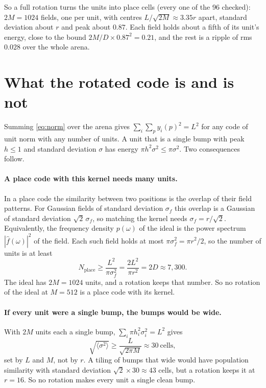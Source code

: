 \documentclass[11pt]{article}
\begin{document}
So a full rotation turns the units into place cells (every one of the 96 checked): $2M = 1024$
fields, one per unit, with centres $L/\sqrt{2M} \approx 3.35r$ apart, standard deviation about $r$
and peak about $0.87$.
Each field holds about a fifth of its unit's energy, close to the bound $2M/D \times 0.87^2 = 0.21$,
and the rest is a ripple of rms $0.028$ over the whole arena.

\section{What the rotated code is and is not}

Summing \eqref{eq:norm} over the arena gives $\sum_i\sum_p y_i(p)^2 = L^2$ for any code of unit
norm with any number of units. A unit that is a single bump with peak $h \le 1$ and standard
deviation $\sigma$ has energy $\pi h^2\sigma^2 \le \pi\sigma^2$. Two consequences follow.

\paragraph{A place code with this kernel needs many units.} In a place code the similarity between
two positions is the overlap of their field patterns. For Gaussian fields of standard deviation
$\sigma_f$ this overlap is a Gaussian of standard deviation $\sqrt2\,\sigma_f$, so matching the
kernel needs $\sigma_f = r/\sqrt2$. Equivalently, the frequency density $p(\omega)$ of the ideal is
the power spectrum $|\hat f(\omega)|^2$ of the field. Each such field holds at most
$\pi\sigma_f^2 = \pi r^2/2$, so the number of units is at least
\begin{equation}
  N_{\text{place}} \ge \frac{L^2}{\pi\sigma_f^2} = \frac{2L^2}{\pi r^2} = 2D \approx 7{,}300 .
\end{equation}
The ideal has $2M = 1024$ units, and a rotation keeps that number. So no rotation of the ideal at
$M = 512$ is a place code with its kernel.

\paragraph{If every unit were a single bump, the bumps would be wide.} With $2M$ units each a single
bump, $\sum_i \pi h_i^2\sigma_i^2 = L^2$ gives
\begin{equation}
  \sqrt{\langle\sigma^2\rangle} \ge \frac{L}{\sqrt{2\pi M}} \approx 30\ \text{cells},
\end{equation}
set by $L$ and $M$, not by $r$. A tiling of bumps that wide would have population similarity with
standard deviation $\sqrt2 \times 30 \approx 43$ cells, but a rotation keeps it at $r = 16$. So no
rotation makes every unit a single clean bump.
\end{document}
